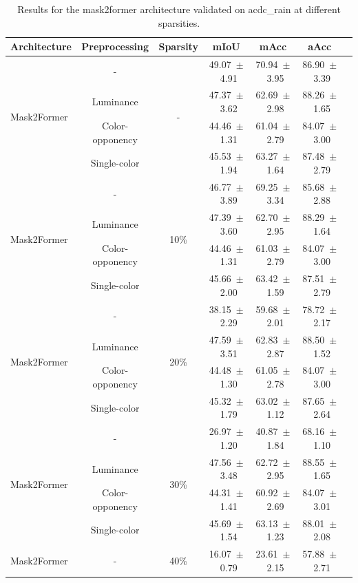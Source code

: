 \begin{table}[h]
\centering
\caption{Results for the mask2former architecture validated on acdc_rain at different sparsities.}
\begin{tabular}{@{}lccc ccc@{}}
\toprule
Architecture & Preprocessing & Sparsity & mIoU & mAcc & aAcc \\
\midrule

\multirow{4}{*}{Mask2Former} & - & \multirow{4}{*}{-} & 49.07~$\pm$~4.91 & 70.94~$\pm$~3.95 & 86.90~$\pm$~3.39 \\
& Luminance & & 47.37~$\pm$~3.62 & 62.69~$\pm$~2.98 & 88.26~$\pm$~1.65 \\
& Color-opponency & & 44.46~$\pm$~1.31 & 61.04~$\pm$~2.79 & 84.07~$\pm$~3.00 \\
& Single-color & & 45.53~$\pm$~1.94 & 63.27~$\pm$~1.64 & 87.48~$\pm$~2.79 \\
\midrule
\multirow{4}{*}{Mask2Former} & - & \multirow{4}{*}{10\%} & 46.77~$\pm$~3.89 & 69.25~$\pm$~3.34 & 85.68~$\pm$~2.88 \\
& Luminance & & 47.39~$\pm$~3.60 & 62.70~$\pm$~2.95 & 88.29~$\pm$~1.64 \\
& Color-opponency & & 44.46~$\pm$~1.31 & 61.03~$\pm$~2.79 & 84.07~$\pm$~3.00 \\
& Single-color & & 45.66~$\pm$~2.00 & 63.42~$\pm$~1.59 & 87.51~$\pm$~2.79 \\
\midrule
\multirow{4}{*}{Mask2Former} & - & \multirow{4}{*}{20\%} & 38.15~$\pm$~2.29 & 59.68~$\pm$~2.01 & 78.72~$\pm$~2.17 \\
& Luminance & & 47.59~$\pm$~3.51 & 62.83~$\pm$~2.87 & 88.50~$\pm$~1.52 \\
& Color-opponency & & 44.48~$\pm$~1.30 & 61.05~$\pm$~2.78 & 84.07~$\pm$~3.00 \\
& Single-color & & 45.32~$\pm$~1.79 & 63.02~$\pm$~1.12 & 87.65~$\pm$~2.64 \\
\midrule
\multirow{4}{*}{Mask2Former} & - & \multirow{4}{*}{30\%} & 26.97~$\pm$~1.20 & 40.87~$\pm$~1.84 & 68.16~$\pm$~1.10 \\
& Luminance & & 47.56~$\pm$~3.48 & 62.72~$\pm$~2.95 & 88.55~$\pm$~1.65 \\
& Color-opponency & & 44.31~$\pm$~1.41 & 60.92~$\pm$~2.69 & 84.07~$\pm$~3.01 \\
& Single-color & & 45.69~$\pm$~1.54 & 63.13~$\pm$~1.23 & 88.01~$\pm$~2.08 \\
\midrule
\multirow{4}{*}{Mask2Former} & - & \multirow{4}{*}{40\%} & 16.07~$\pm$~0.79 & 23.61~$\pm$~2.15 & 57.88~$\pm$~2.71 \\

\end{tabular}
\end{table}
